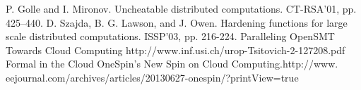 \documentclass[runningheads,a4paper]{llncs}
\begin{document}
\begin{thebibliography}{4}
	P. Golle and I. Mironov.
Uncheatable distributed computations.
CT-RSA'01, pp. 425–440.
	D. Szajda, B. G. Lawson, and J. Owen.
Hardening functions for large scale distributed computations.
ISSP'03, pp. 216-224.
	Paralleling OpenSMT Towards Cloud Computing http://www.inf.usi.ch/urop-Tsitovich-2-127208.pdf‎
	Formal in the Cloud OneSpin’s New Spin on Cloud Computing.http://www. eejournal.com/archives/articles/20130627-onespin/?printView=true

\end{thebibliography}
\end{document}

